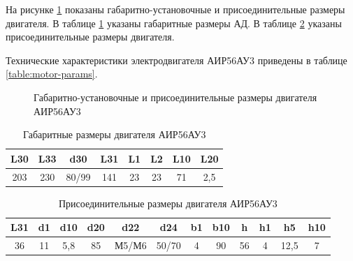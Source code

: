         На рисунке \ref{fig:motor-overall-dimentions} показаны
        габаритно-установочные и присоединительные размеры двигателя. В таблице
        \ref{table:motor-overall-dimentions} указаны габаритные размеры АД. В
        таблице \ref{table:motor-mounting-dimentions} указаны присоединительные
        размеры двигателя. 
        
        Технические характеристики электродвигателя АИР56АУ3 приведены в
        таблице \ref{table:motor-params}.

        \begin{figure}[h!]
            \caption{%
                Габаритно-установочные и присоединительные размеры
                двигателя АИР56АУ3
            }
            \label{fig:motor-overall-dimentions}
        \end{figure}
	
        \begin{longtable}{|c|c|c|c|c|c|c|c|}
            \caption{Габаритные размеры двигателя АИР56АУ3
                \label{table:motor-overall-dimentions}}\\
            \hline
            L30 & L33 & d30 & L31 & L1 & L2 & L10 & L20\\
            \hline
            \endfirsthead
            203 & 230 & 80/99 & 141 & 23 & 23 & 71 & 2,5\\
            \hline
        \end{longtable}
        
        \begin{longtable}{|c|c|c|c|c|c|c|c|c|c|c|c|}
            \caption{Присоединительные размеры двигателя АИР56АУ3
                \label{table:motor-mounting-dimentions}}\\
            \hline
            L31 & d1 & d10 & d20 & d22 & d24 & b1 & b10 & h & h1 & h5 & h10\\
            \hline
            \endfirsthead
            36 & 11 & 5,8 & 85 & М5/М6 & 50/70 & 4 & 90 & 56 & 4 & 12,5 & 7\\
            \hline
        \end{longtable}	

